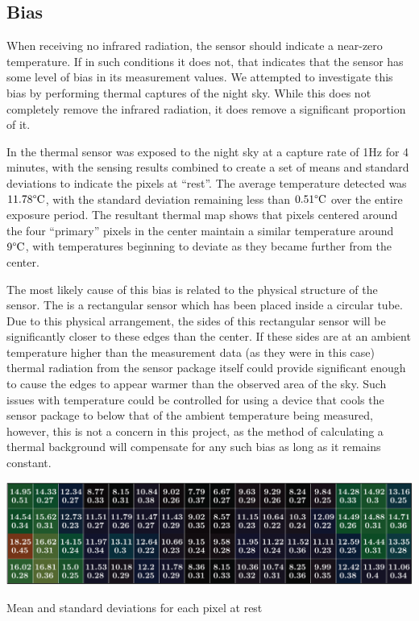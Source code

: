 \documentclass[../thesis/thesis.tex]{subfiles}
\begin{document}
\subsection{Bias}
When receiving no infrared radiation, the sensor should indicate a near-zero temperature. If in such conditions it does not, that indicates that the sensor has some level of bias in its measurement values. We attempted to investigate this bias by performing thermal captures of the night sky. While this does not completely remove the infrared radiation, it does remove a significant proportion of it.

In  the thermal sensor was exposed to the night sky at a capture rate of 1Hz for 4 minutes, with the sensing results combined to create a set of means and standard deviations to indicate the pixels at ``rest''. The average temperature detected was $11.78\degree\textrm{C}$, with the standard deviation remaining less than $0.51\degree\textrm{C}$ over the entire exposure period. The resultant thermal map shows that pixels centered around the four ``primary'' pixels in the center maintain a similar temperature around $9\degree\textrm{C}$, with temperatures beginning to deviate as they became further from the center.

The most likely cause of this bias is related to the physical structure of the sensor. The \mlx is a rectangular sensor which has been placed inside a circular tube. Due to this physical arrangement, the sides of this rectangular sensor will be significantly closer to these edges than the center. If these sides are at an ambient temperature higher than the measurement data (as they were in this case) thermal radiation from the sensor package itself could provide significant enough to cause the edges to appear warmer than the observed area of the sky. Such issues with temperature could be controlled for using a device that cools the sensor package to below that of the ambient temperature being measured, however, this is not a concern in this project, as the method of calculating a thermal background will compensate for any such bias as long as it remains constant.

\begin{landscape}
\begin{table}
\centering
\includegraphics{../diagrams/sensor-bias-thermal-map.pdf}
\caption{Mean and standard deviations for each pixel at rest}
\label{tab:meanstd}
\end{table}
\end{landscape}
\end{document}
